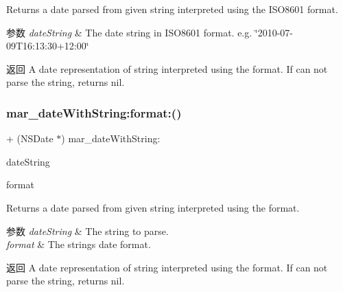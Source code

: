 Returns a date parsed from given string interpreted using the I\+S\+O8601 format.


\begin{DoxyParams}{参数}
{\em date\+String} & The date string in I\+S\+O8601 format. e.\+g. \char`\"{}2010-\/07-\/09\+T16\+:13\+:30+12\+:00\char`\"{}\\
\hline
\end{DoxyParams}
\begin{DoxyReturn}{返回}
A date representation of string interpreted using the format. If can not parse the string, returns nil. 
\end{DoxyReturn}
\mbox{\label{category_n_s_date_07_m_a_r_e_x_08_a60ba70b89bb130aef960fbaf551d81ab}} 
\subsubsection{\texorpdfstring{mar\+\_\+date\+With\+String\+:format\+:()}{mar\_dateWithString:format:()}}
{\footnotesize\ttfamily + (N\+S\+Date $\ast$) mar\+\_\+date\+With\+String\+: \begin{DoxyParamCaption}\item[{(N\+S\+String $\ast$)}]{date\+String }\item[{format:(N\+S\+String $\ast$)}]{format }\end{DoxyParamCaption}}

Returns a date parsed from given string interpreted using the format.


\begin{DoxyParams}{参数}
{\em date\+String} & The string to parse. \\
\hline
{\em format} & The string\textquotesingle{}s date format.\\
\hline
\end{DoxyParams}
\begin{DoxyReturn}{返回}
A date representation of string interpreted using the format. If can not parse the string, returns nil. 
\end{DoxyReturn}
\mbox{\label{category_n_s_date_07_m_a_r_e_x_08_a880715cf7278a2889ec2e44c90eaf8c1}} 
